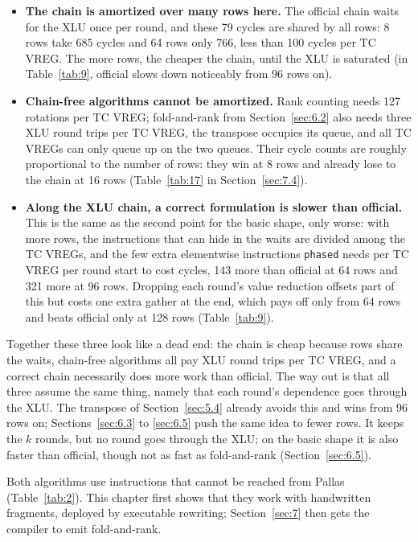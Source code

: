\documentclass[sigconf,nonacm,balance=false]{acmart}
\newcommand{\code}[1]{\texttt{#1}}
\begin{document}
\begin{itemize}
\item \textbf{The chain is amortized over many rows here.} The official chain waits for the XLU once per round, and these 79 cycles are shared by all rows: 8 rows take 685 cycles and 64 rows only 766, less than 100 cycles per TC VREG. The more rows, the cheaper the chain, until the XLU is saturated (in Table~\ref{tab:9}, official slows down noticeably from 96 rows on).
\item \textbf{Chain-free algorithms cannot be amortized.} Rank counting needs 127 rotations per TC VREG; fold-and-rank from Section~\ref{sec:6.2} also needs three XLU round trips per TC VREG, the transpose occupies its queue, and all TC VREGs can only queue up on the two queues. Their cycle counts are roughly proportional to the number of rows: they win at 8 rows and already lose to the chain at 16 rows (Table~\ref{tab:17} in Section~\ref{sec:7.4}).
\item \textbf{Along the XLU chain, a correct formulation is slower than official.} This is the same as the second point for the basic shape, only worse: with more rows, the instructions that can hide in the waits are divided among the TC VREGs, and the few extra elementwise instructions \code{phased} needs per TC VREG per round start to cost cycles, 143 more than official at 64 rows and 321 more at 96 rows. Dropping each round's value reduction offsets part of this but costs one extra gather at the end, which pays off only from 64 rows and beats official only at 128 rows (Table~\ref{tab:9}).
\end{itemize}

Together these three look like a dead end: the chain is cheap because rows share the waits, chain-free algorithms all pay XLU round trips per TC VREG, and a correct chain necessarily does more work than official. The way out is that all three assume the same thing, namely that each round's dependence goes through the XLU. The transpose of Section~\ref{sec:5.4} already avoids this and wins from 96 rows on; Sections~\ref{sec:6.3} to \ref{sec:6.5} push the same idea to fewer rows. It keeps the $k$ rounds, but no round goes through the XLU; on the basic shape it is also faster than official, though not as fast as fold-and-rank (Section~\ref{sec:6.5}).

Both algorithms use instructions that cannot be reached from Pallas (Table~\ref{tab:2}). This chapter first shows that they work with handwritten fragments, deployed by executable rewriting; Section~\ref{sec:7} then gets the compiler to emit fold-and-rank.
\end{document}
